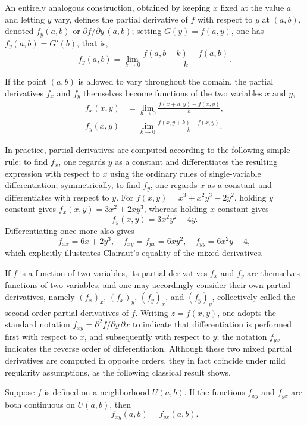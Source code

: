 An entirely analogous construction, obtained by keeping $x$ fixed at the value $a$ and letting $y$ vary, defines the partial derivative of $f$ with respect to $y$ at $(a,b)$, denoted $f_y(a,b)$ or $\partial f/\partial y \, (a,b)$; setting $G(y) = f(a,y)$, one has $f_y(a,b) = G'(b)$, that is,
\[
f_y(a,b) = \lim_{k \to 0} \frac{f(a,b+k) - f(a,b)}{k}.
\]

If the point $(a,b)$ is allowed to vary throughout the domain, the partial derivatives $f_x$ and $f_y$ themselves become functions of the two variables $x$ and $y$,
\[
\begin{aligned}
f_x(x,y) &= \lim_{h \to 0} \frac{f(x+h,y) - f(x,y)}{h}, \\[0.5em]
f_y(x,y) &= \lim_{k \to 0} \frac{f(x,y+k) - f(x,y)}{k}.
\end{aligned}
\]

In practice, partial derivatives are computed according to the following simple rule: to find $f_x$, one regards $y$ as a constant and differentiates the resulting expression with respect to $x$ using the ordinary rules of single-variable differentiation; symmetrically, to find $f_y$, one regards $x$ as a constant and differentiates with respect to $y$. For $f(x,y) = x^3 + x^2 y^3 - 2y^2$. holding $y$ constant gives $f_x(x,y)=3x^2+2xy^3$, whereas holding $x$ constant gives
\[
f_y(x,y)=3x^2y^2-4y.
\]
Differentiating once more also gives
\[
f_{xx}=6x+2y^3,\quad
f_{xy}=f_{yx}=6xy^2,\quad
f_{yy}=6x^2y-4,
\]
which explicitly illustrates Clairaut's equality of the mixed derivatives.

If $f$ is a function of two variables, its partial derivatives $f_x$ and $f_y$ are themselves functions of two variables, and one may accordingly consider their own partial derivatives, namely $(f_x)_x$, $(f_x)_y$, $(f_y)_x$, and $(f_y)_y$, collectively called the second-order partial derivatives of $f$. Writing $z = f(x,y)$, one adopts the standard notation $f_{xy} = \partial^2 f / \partial y\, \partial x$ to indicate that differentiation is performed first with respect to $x$, and subsequently with respect to $y$; the notation $f_{yx}$ indicates the reverse order of differentiation. Although these two mixed partial derivatives are computed in opposite orders, they in fact coincide under mild regularity assumptions, as the following classical result shows.

\begin{theorem}
Suppose $f$ is defined on a neighborhood $U(a,b)$. If the functions $f_{xy}$ and $f_{yx}$ are both continuous on $U(a,b)$, then
\[
f_{xy}(a,b) = f_{yx}(a,b).
\]

\end{theorem}

